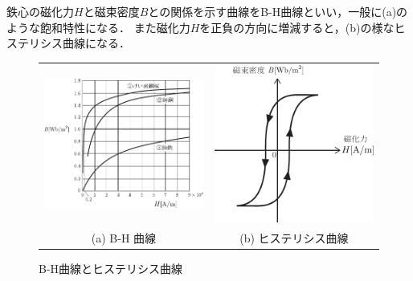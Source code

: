 鉄心の磁化力$H$と磁束密度$B$との関係を示す曲線をB-H曲線といい，一般に(a)のような飽和特性になる．
また磁化力$H$を正負の方向に増減すると，(b)の様なヒステリシス曲線になる．
\begin{figure}[htbp]
	\centering
	\begin{tabular}{cc}
		\includegraphics[width=70mm]{fig/bhcurve.pdf} &
		\includegraphics[width=70mm]{fig/hysteresis.pdf} \\
		(a) B-H 曲線 & (b) ヒステリシス曲線
	\end{tabular}
	\caption{B-H曲線とヒステリシス曲線}
	\label{fig:hys:bhcurve}
\end{figure}

